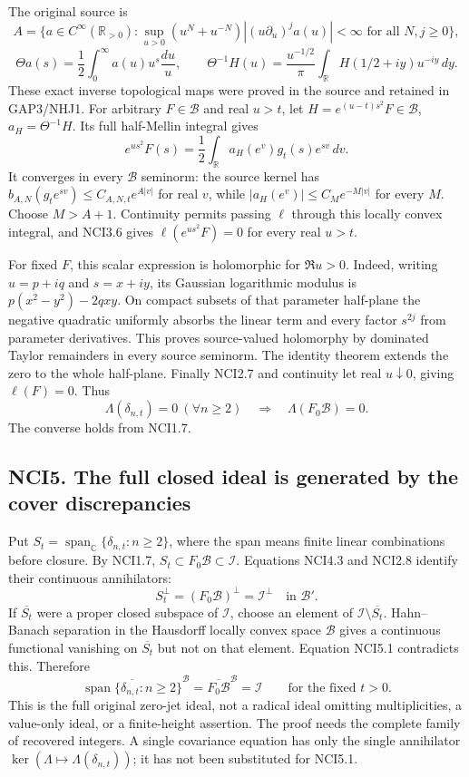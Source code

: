 The original source is \[
A=\{a\in C^\infty(\mathbb R_{>0}):
\sup_{u>0}(u^N+u^{-N})|(u\partial_u)^j a(u)|<\infty
\text{ for all }N,j\ge0\},
\] \[
\Theta a(s)=\frac12\int_0^\infty a(u)u^s\frac{du}{u},\qquad
\Theta^{-1}H(u)=\frac{u^{-1/2}}\pi
\int_{\mathbb R}H(1/2+iy)u^{-iy}\,dy.
\tag{NCI4.1}
\] These exact inverse topological maps were proved in the source and
retained in GAP3/NHJ1. For arbitrary \(F\in\mathcal B\) and real
\(u>t\), let \(H=e^{(u-t)s^2}F\in\mathcal B\), \(a_H=\Theta^{-1}H\). Its
full half-Mellin integral gives \[
e^{us^2}F(s)=\frac12\int_{\mathbb R}
a_H(e^v)g_t(s)e^{sv}\,dv.
\tag{NCI4.2}
\] It converges in every \(\mathcal B\) seminorm: the source kernel has
\(b_{A,N}(g_t e^{sv})\le C_{A,N,t}e^{A|v|}\) for real \(v\), while
\(|a_H(e^v)|\le C_Me^{-M|v|}\) for every \(M\). Choose \(M>A+1\).
Continuity permits passing \(\ell\) through this locally convex
integral, and NCI3.6 gives \(\ell(e^{us^2}F)=0\) for every real \(u>t\).

For fixed \(F\), this scalar expression is holomorphic for \(\Re u>0\).
Indeed, writing \(u=p+iq\) and \(s=x+iy\), its Gaussian logarithmic
modulus is \(p(x^2-y^2)-2qxy\). On compact subsets of that parameter
half-plane the negative quadratic uniformly absorbs the linear term and
every factor \(s^{2j}\) from parameter derivatives. This proves
source-valued holomorphy by dominated Taylor remainders in every source
seminorm. The identity theorem extends the zero to the whole half-plane.
Finally NCI2.7 and continuity let real \(u\downarrow0\), giving
\(\ell(F)=0\). Thus \[
\Lambda(\delta_{n,t})=0\ (\forall n\ge2)
\quad\Longrightarrow\quad
\Lambda(F_0\mathcal B)=0.
\tag{NCI4.3}
\] The converse holds from NCI1.7.

\subsection{NCI5. The full closed ideal is generated by the cover
discrepancies}\label{nci5.-the-full-closed-ideal-is-generated-by-the-cover-discrepancies}

Put \(S_t=\operatorname{span}_{\mathbb C}\{\delta_{n,t}:n\ge2\}\), where
the span means finite linear combinations before closure. By NCI1.7,
\(S_t\subset F_0\mathcal B\subset\mathcal I\). Equations NCI4.3 and
NCI2.8 identify their continuous annihilators: \[
S_t^\perp=(F_0\mathcal B)^\perp=\mathcal I^\perp
\quad\text{in }\mathcal B'.
\tag{NCI5.1}
\] If \(\overline{S_t}\) were a proper closed subspace of
\(\mathcal I\), choose an element of
\(\mathcal I\setminus\overline{S_t}\). Hahn--Banach separation in the
Hausdorff locally convex space \(\mathcal B\) gives a continuous
functional vanishing on \(\overline{S_t}\) but not on that element.
Equation NCI5.1 contradicts this. Therefore \[
\boxed{\overline{\operatorname{span}\{\delta_{n,t}:n\ge2\}}^{\mathcal B}
=\overline{F_0\mathcal B}^{\mathcal B}
=\mathcal I\qquad\text{for the fixed }t>0.}
\tag{NCI5.2}
\] This is the full original zero-jet ideal, not a radical ideal
omitting multiplicities, a value-only ideal, or a finite-height
assertion. The proof needs the complete family of recovered integers. A
single covariance equation has only the single annihilator
\(\ker(\Lambda\mapsto\Lambda(\delta_{n,t}))\); it has not been
substituted for NCI5.1.

